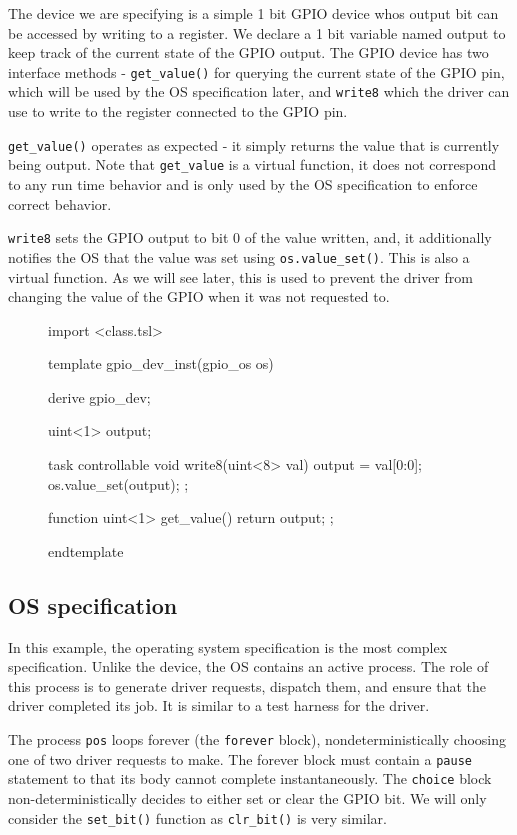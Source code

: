 \documentclass{article}
\newcommand{\code}[1]{\texttt{#1}}
\begin{document}
The device we are specifying is a simple 1 bit GPIO device whos output bit can be accessed by writing to a register. We declare a 1 bit variable named output to keep track of the current state of the GPIO output. The GPIO device has two interface methods - \code{get\_value()} for querying the current state of the GPIO pin, which will be used by the OS specification later, and \code{write8} which the driver can use to write to the register connected to the GPIO pin. 

\code{get\_value()} operates as expected - it simply returns the value that is currently being output. Note that \code{get\_value} is a virtual function, it does not correspond to any run time behavior and is only used by the OS specification to enforce correct behavior. 

\code{write8} sets the GPIO output to bit 0 of the value written, and, it additionally notifies the OS that the value was set using \code{os.value\_set()}. This is also a virtual function. As we will see later, this is used to prevent the driver from changing the value of the GPIO when it was not requested to.

\begin{figure}[H]
\lstset{numbers=left}
\begin{tsllisting}
import <class.tsl>

template gpio_dev_inst(gpio_os os)

derive gpio_dev;

uint<1> output;

task controllable void write8(uint<8> val){
    output = val[0:0];
    os.value_set(output);
};

function uint<1> get_value(){
    return output;
};

endtemplate
\end{tsllisting}
\end{figure}

\subsection{OS specification}

In this example, the operating system specification is the most complex specification. Unlike the device, the OS contains an active process. The role of this process is to generate driver requests, dispatch them, and ensure that the driver completed its job. It is similar to a test harness for the driver. 

The process \code{pos} loops forever (the \code{forever} block), nondeterministically choosing one of two driver requests to make. The forever block must contain a \code{pause} statement to that its body cannot complete instantaneously. The \code{choice} block non-deterministically decides to either set or clear the GPIO bit. We will only consider the \code{set\_bit()} function as \code{clr\_bit()} is very similar. 
\end{document}
